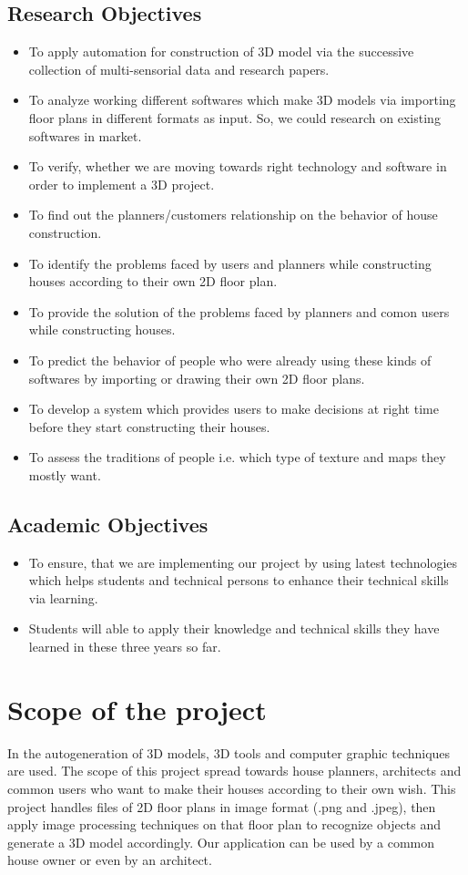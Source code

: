\documentclass{article}
\begin{document}
\subsection{Research Objectives}
\begin{itemize}
\item To apply automation for construction of 3D model via the successive collection of multi-sensorial data and research papers.
\item To analyze working different softwares which make 3D models via importing floor plans in different formats as input. So, we could research on existing softwares in market.
\item To verify, whether we are moving towards right technology and software in order to implement a 3D project.
\item To find out the planners/customers relationship on the behavior of house construction.
\item To identify the problems faced by users and planners while constructing houses according to their own 2D floor plan.
\item To provide the solution of the problems faced by planners and comon users while constructing houses.
\item To predict the behavior of people who were already using these kinds of softwares by importing or drawing their own 2D floor plans.
\item To develop a system which provides users to make decisions at right time before they start constructing their houses.
\item To assess the traditions of people i.e. which type of texture and maps they mostly want.

\end{itemize}
\subsection{Academic Objectives}
\begin{itemize}
\item	To ensure, that we are implementing our project by using latest technologies which helps students and technical persons to enhance their technical skills via learning.
\item Students will able to apply their knowledge and technical skills they have learned in these three years so far.

\end{itemize}
\section{Scope of the project}
In the autogeneration of 3D models, 3D tools and computer graphic techniques are used.
The scope of this project spread towards house planners, architects and common users
who want to make their houses according to their own wish.
This project handles files of 2D floor plans in image format (.png and .jpeg), then apply image
processing techniques on that floor plan to recognize objects and  generate a 3D model accordingly. 
Our application can be used by a common house owner or even by an architect.\cite{Projectscope}\\
\end{document}

